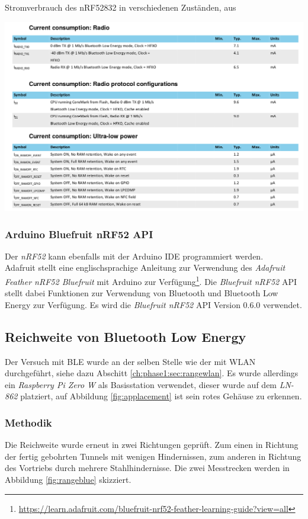 \begin{table}[h]
  \centering
  \caption{Stromverbrauch des nRF52832 in verschiedenen Zuständen, aus \cite{nordic2017nrf}}
	\includegraphics[width=\textwidth]{images/nrf52consumption.png}
  \label{table:nrf52consumption}
\end{table}


\subsubsection{Arduino Bluefruit nRF52 API}
Der \emph{nRF52} kann ebenfalls mit der Arduino IDE programmiert werden.\\
Adafruit stellt eine englischsprachige Anleitung zur Verwendung des \textit{Adafruit Feather nRF52 Bluefruit} mit Arduino zur Verfügung\footnote{\url{https://learn.adafruit.com/bluefruit-nrf52-feather-learning-guide?view=all}}.
Die \emph{Bluefruit nRF52} API stellt dabei Funktionen zur Verwendung von Bluetooth und Bluetooth Low Energy zur Verfügung.
Es wird die \emph{Bluefruit nRF52} API Version 0.6.0 verwendet.



\subsection{Reichweite von Bluetooth Low Energy}
Der Versuch mit BLE wurde an der selben Stelle wie der mit WLAN durchgeführt, siehe dazu Abschitt \ref{ch:phase1:sec:rangewlan}.
Es wurde allerdings ein \emph{Raspberry Pi Zero W} als Basisstation verwendet, dieser wurde auf dem \emph{LN-862} platziert, auf Abbildung \ref{fig:applacement} ist sein rotes Gehäuse zu erkennen.

\subsubsection{Methodik}
Die Reichweite wurde erneut in zwei Richtungen geprüft. 
Zum einen in Richtung der fertig gebohrten Tunnels mit wenigen Hindernissen, zum anderen in Richtung des Vortriebs durch mehrere Stahlhindernisse.
Die zwei Messtrecken werden in Abbildung \ref{fig:rangeblue} skizziert.

